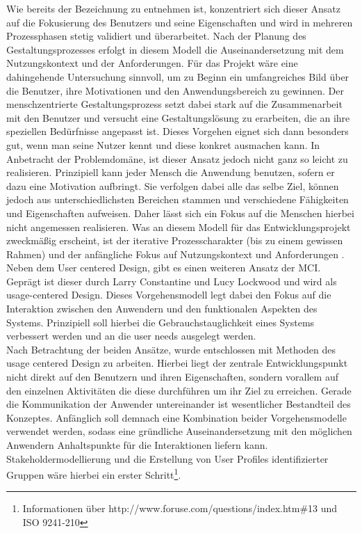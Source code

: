 Wie bereits der Bezeichnung zu entnehmen ist, konzentriert sich dieser Ansatz auf die Fokusierung des Benutzers und seine Eigenschaften und wird in mehreren Prozessphasen stetig validiert und überarbeitet. Nach der Planung des Gestaltungsprozesses erfolgt in diesem Modell die Auseinandersetzung mit dem Nutzungskontext und der Anforderungen. Für das Projekt wäre eine dahingehende Untersuchung sinnvoll, um zu Beginn ein umfangreiches Bild über die Benutzer, ihre Motivationen und den Anwendungsbereich zu gewinnen. 
Der menschzentrierte Gestaltungsprozess setzt dabei stark auf die Zusammenarbeit mit den Benutzer und versucht eine Gestaltungslösung zu erarbeiten, die an ihre speziellen Bedürfnisse angepasst ist. Dieses Vorgehen eignet sich dann besonders gut, wenn man seine Nutzer kennt und diese konkret ausmachen kann. In Anbetracht der Problemdomäne, ist dieser Ansatz jedoch nicht ganz so leicht zu realisieren. Prinzipiell kann jeder Mensch die Anwendung benutzen, sofern er dazu eine Motivation aufbringt. Sie verfolgen dabei alle das selbe Ziel, können jedoch aus unterschiedlichsten Bereichen stammen und verschiedene Fähigkeiten und Eigenschaften aufweisen. Daher lässt sich ein Fokus auf die Menschen hierbei nicht angemessen realisieren. Was an diesem Modell für das Entwicklungsprojekt zweckmäßig erscheint, ist der iterative Prozesscharakter (bis zu einem gewissen Rahmen) und der anfängliche Fokus auf Nutzungskontext und Anforderungen .\\
Neben dem User centered Design, gibt es einen weiteren Ansatz der MCI. Geprägt ist dieser durch Larry Constantine und Lucy Lockwood und wird als usage-centered Design. Dieses Vorgehensmodell legt dabei den Fokus auf die Interaktion zwischen den Anwendern und den funktionalen Aspekten des Systems. Prinzipiell soll hierbei die Gebrauchstauglichkeit eines Systems verbessert werden und an die user needs ausgelegt werden. \\
Nach Betrachtung der beiden Ansätze, wurde entschlossen mit Methoden des usage centered Design zu arbeiten. Hierbei liegt der zentrale Entwicklungspunkt nicht direkt auf den Benutzern und ihren Eigenschaften, sondern vorallem auf den einzelnen Aktivitäten die diese durchführen um ihr Ziel zu erreichen. Gerade die Kommunikation der Anwender untereinander ist wesentlicher Bestandteil des Konzeptes. Anfänglich soll demnach eine Kombination beider Vorgehensmodelle verwendet werden, sodass eine gründliche Auseinandersetzung mit den möglichen Anwendern Anhaltspunkte für die Interaktionen liefern kann. Stakeholdermodellierung und die Erstellung von User Profiles identifizierter Gruppen wäre hierbei ein erster Schritt\footnote{Informationen über http://www.foruse.com/questions/index.htm\#13 und ISO 9241-210}. 

\newpage



\newpage



\newpage



\newpage



\newpage



\newpage
